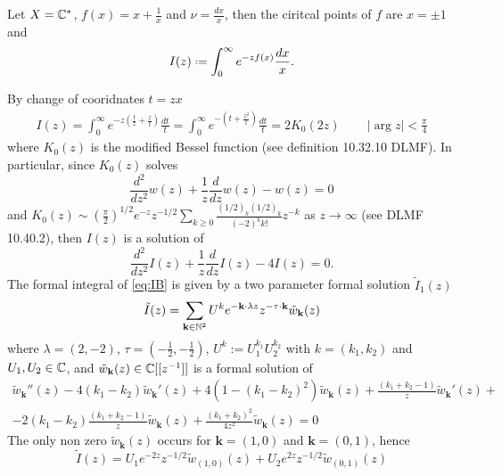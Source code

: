 \documentclass[11pt,a4paper,twoside,leqno,noamsfonts]{amsart}
\numberwithin{equation}{section}
\begin{document}
\begin{example}[Bessel]

Let $X=\mathbb C^*$, $f(x)=x+\frac{1}{x}$ and $\nu=\frac{dx}{x}$, then the ciritcal points of $f$ are $x=\pm1$ and 
\begin{equation}
I(z)\defeq\int_0^{\infty}e^{-zf(x)}\frac{dx}{x}.
\end{equation}

By change of cooridnates $t=zx$
\begin{align*}
I(z)=\int_0^{\infty}e^{-z\left(\frac{t}{z}+\frac{z}{t}\right)}\frac{dt}{t}=\int_0^{\infty}e^{-\left(t+\frac{z^2}{t}\right)}\frac{dt}{t}=2K_0(2z) \,\qquad |\arg z|<\frac{\pi}{4}
\end{align*}
where $K_0(z)$ is the modified Bessel function (see definition 10.32.10 DLMF). In particular, since $K_0(z)$ solves 
\begin{equation}
\frac{d^2}{dz^2}w(z)+\frac{1}{z}\frac{d}{dz}w(z)-w(z)=0
\end{equation}
and $K_0(z)\sim\left(\frac{\pi}{2}\right)^{1/2}e^{-z}z^{-1/2}\sum_{k\geq 0}\frac{(1/2)_k(1/2)_k}{(-2)^kk!}z^{-k}$ as $z\to\infty$ (see DLMF 10.40.2), then $I(z)$ is a solution of 
\begin{equation}
\label{eq:IB}
\frac{d^2}{dz^2}I(z)+\frac{1}{z}\frac{d}{dz}I(z)-4I(z)=0.
\end{equation} 
The formal integral of \eqref{eq:IB} is given by a two parameter formal solution $\tilde{I}_1(z)$
\begin{equation}
\tilde{I}(z)=\sum_{\mathbf{k}\in\mathbb N^2}U^ke^{-\mathbf{k}\cdot\lambda z}z^{-\tau\cdot \mathbf{k}}\tilde{w}_{\mathbf{k}}(z)
\end{equation}
where $\lambda=(2,-2)$, $\tau=(-\frac{1}{2},-\frac{1}{2})$, $U^k:=U_1^{k_1}U_2^{k_2}$ with $k=(k_1,k_2)$ and $U_1,U_2\in\mathbb C$, and $\tilde{w}_{\mathbf{k}}(z)\in\mathbb C[[z^{-1}]]$ is a formal solution of 
\begin{multline}
\tilde{w}_{\mathbf{k}}''(z)-4(k_1-k_2)\tilde{w}_{\mathbf{k}}'(z)+4(1-(k_1-k_2)^2)\tilde{w}_{\mathbf{k}}(z)+\frac{(k_1+k_2-1)}{z}\tilde{w}_{\mathbf{k}}'(z)+\\
-2(k_1-k_2)\frac{(k_1+k_2-1)}{z}\tilde{w}_{\mathbf{k}}(z)+\frac{(k_1+k_2)^2}{4z^2}\tilde{w}_{\mathbf{k}}(z)=0
\end{multline}
The only non zero $\tilde{w}_{\mathbf{k}}(z)$ occurs for $\mathbf{k}=(1,0)$ and $\mathbf{k}=(0,1)$, hence 
\begin{equation}
\tilde{I}(z)=U_1 e^{-2z}z^{-1/2}\tilde{w}_{(1,0)}(z)+U_2e^{2z}z^{-1/2}\tilde{w}_{(0,1)}(z)
\end{equation}

\end{example}
\end{document}
